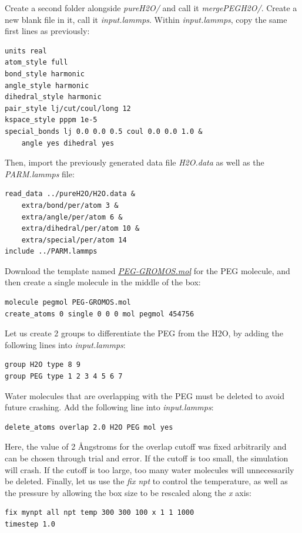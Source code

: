 \documentclass[9pt,tutorial]{livecoms}
\begin{document}
Create a second folder alongside \textit{pureH2O/} and call it \textit{mergePEGH2O/}. Create a new blank file in it,
call it \textit{input.lammps}. Within \textit{input.lammps}, copy the same first lines as previously:
{\normalsize \begin{verbatim}
units real
atom_style full
bond_style harmonic
angle_style harmonic
dihedral_style harmonic
pair_style lj/cut/coul/long 12
kspace_style pppm 1e-5
special_bonds lj 0.0 0.0 0.5 coul 0.0 0.0 1.0 &
    angle yes dihedral yes
\end{verbatim}}
Then, import the previously generated data file \textit{H2O.data} as well as the \textit{PARM.lammps} file:
{\normalsize \begin{verbatim}
read_data ../pureH2O/H2O.data &
    extra/bond/per/atom 3 &
    extra/angle/per/atom 6 &
    extra/dihedral/per/atom 10 &
    extra/special/per/atom 14
include ../PARM.lammps
\end{verbatim}}
Download the template named \href{https://raw.githubusercontent.com/lammpstutorials/lammpstutorials-article/main/files/tutorial3/PEG-GROMOS.mol}{\textit{PEG-GROMOS.mol}} for the PEG molecule, and then create a single molecule in the middle of the box:
{\normalsize \begin{verbatim}
molecule pegmol PEG-GROMOS.mol
create_atoms 0 single 0 0 0 mol pegmol 454756
\end{verbatim}}
Let us create 2 groups to differentiate the PEG from the H2O, by adding the following lines into \textit{input.lammps}:
{\normalsize \begin{verbatim}
group H2O type 8 9
group PEG type 1 2 3 4 5 6 7
\end{verbatim}}
Water molecules that are overlapping with the PEG must be deleted to avoid future crashing. Add the following line into \textit{input.lammps}:
{\normalsize \begin{verbatim}
delete_atoms overlap 2.0 H2O PEG mol yes
\end{verbatim}}
Here, the value of 2 Ångstroms for the overlap cutoff was fixed arbitrarily and can be chosen through trial and error. If the cutoff is too small, the simulation will crash. If the cutoff is too large, too many water molecules will unnecessarily be deleted.
Finally, let us use the \textit{fix npt} to control the temperature, as well as the pressure by allowing the box size to be rescaled along the \textit{x} axis:
{\normalsize \begin{verbatim}
fix mynpt all npt temp 300 300 100 x 1 1 1000
timestep 1.0
\end{verbatim}}
\end{document}
